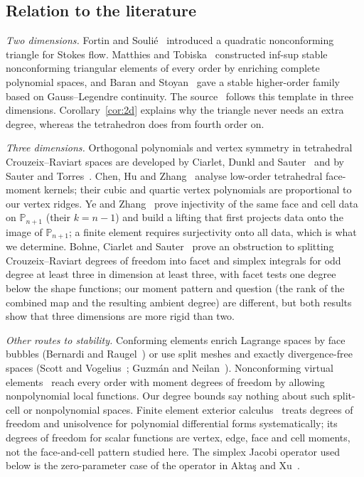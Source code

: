 \documentclass[11pt,a4paper]{article}
\theoremstyle{definition}
\theoremstyle{remark}
\newcommand{\Pol}{\mathbb P}
\begin{document}
\subsection{Relation to the literature}

\emph{Two dimensions.} Fortin and Soulié~\cite{FS1983} introduced a
quadratic nonconforming triangle for Stokes flow. Matthies and
Tobiska~\cite{MT2005} constructed inf-sup stable nonconforming
triangular elements of every order by enriching complete polynomial
spaces, and Baran and Stoyan~\cite{BS2007} gave a stable higher-order
family based on Gauss--Legendre continuity. The source~\cite{BAJO2025}
follows this template in three dimensions. Corollary~\ref{cor:2d}
explains why the triangle never needs an extra degree, whereas the
tetrahedron does from fourth order on.

\emph{Three dimensions.} Orthogonal polynomials and vertex symmetry in
tetrahedral Crouzeix--Raviart spaces are developed by Ciarlet, Dunkl and
Sauter~\cite{CDS2018} and by Sauter and Torres~\cite{ST2023}. Chen, Hu and
Zhang~\cite{CHZ2023} analyse low-order tetrahedral face-moment kernels;
their cubic and quartic vertex polynomials are proportional to our
vertex ridges. Ye and Zhang~\cite{YZ2021} prove injectivity of the same
face and cell data on \(\Pol_{n+1}\) (their \(k=n-1\)) and build a lifting
that first projects data onto the image of \(\Pol_{n+1}\); a finite
element requires surjectivity onto all data, which is what we determine.
Bohne, Ciarlet and Sauter~\cite[\S6.3, Thm.~35]{BCS2026} prove an
obstruction to splitting Crouzeix--Raviart degrees of freedom into facet
and simplex integrals for odd degree at least three in dimension at
least three, with facet tests one degree below the shape functions;
our moment pattern and question (the rank of the combined map and the
resulting ambient degree) are different, but both results show that
three dimensions are more rigid than two.

\emph{Other routes to stability.} Conforming elements enrich Lagrange
spaces by face bubbles (Bernardi and Raugel~\cite{BR1985}) or use split
meshes and exactly divergence-free spaces (Scott and
Vogelius~\cite{SV1985}; Guzmán and Neilan~\cite{GN2014a,GN2014b}).
Nonconforming virtual elements~\cite{CGM2016} reach every order with
moment degrees of freedom by allowing nonpolynomial local functions. Our
degree bounds say nothing about such split-cell or nonpolynomial
spaces. Finite element exterior calculus~\cite{AFW2006} treats degrees of
freedom and unisolvence for polynomial differential forms systematically;
its degrees of freedom for scalar functions are vertex, edge, face and
cell moments, not the face-and-cell pattern studied here. The simplex
Jacobi operator used below is the zero-parameter case of the operator in
Aktaş and Xu~\cite{AX2013}.
\end{document}

